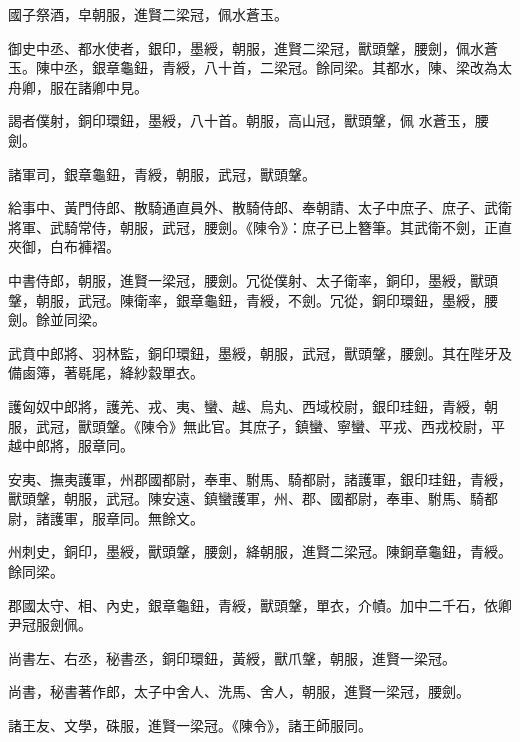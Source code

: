 \begin{pinyinscope}
 國子祭酒，皁朝服，進賢二梁冠，佩水蒼玉。



 御史中丞、都水使者，銀印，墨綬，朝服，進賢二梁冠，獸頭鞶，腰劍，佩水蒼玉。陳中丞，銀章龜鈕，青綬，八十首，二梁冠。餘同梁。其都水，陳、梁改為太舟卿，服在諸卿中見。



 謁者僕射，銅印環鈕，墨綬，八十首。朝服，高山冠，獸頭鞶，佩
 水蒼玉，腰劍。



 諸軍司，銀章龜鈕，青綬，朝服，武冠，獸頭鞶。



 給事中、黃門侍郎、散騎通直員外、散騎侍郎、奉朝請、太子中庶子、庶子、武衛將軍、武騎常侍，朝服，武冠，腰劍。《陳令》：庶子已上簪筆。其武衛不劍，正直夾御，白布褲褶。



 中書侍郎，朝服，進賢一梁冠，腰劍。冗從僕射、太子衛率，銅印，墨綬，獸頭鞶，朝服，武冠。陳衛率，銀章龜鈕，青綬，不劍。冗從，銅印環鈕，墨綬，腰劍。餘並同梁。



 武賁中郎將、羽林監，銅印環鈕，墨綬，朝服，武冠，獸頭鞶，腰劍。其在陛牙及備鹵簿，著毼尾，絳紗縠單衣。



 護匈奴中郎將，護羌、戎、夷、蠻、越、烏丸、西域校尉，銀印珪鈕，青綬，朝服，武冠，獸頭鞶。《陳令》無此官。其庶子，鎮蠻、寧蠻、平戎、西戎校尉，平越中郎將，服章同。



 安夷、撫夷護軍，州郡國都尉，奉車、駙馬、騎都尉，諸護軍，銀印珪鈕，青綬，獸頭鞶，朝服，武冠。陳安遠、鎮蠻護軍，州、郡、國都尉，奉車、駙馬、騎都尉，諸護軍，服章同。無餘文。



 州刺史，銅印，墨綬，獸頭鞶，腰劍，絳朝服，進賢二梁冠。陳銅章龜鈕，青綬。餘同梁。



 郡國太守、相、內史，銀章龜鈕，青綬，獸頭鞶，單衣，介幘。加中二千石，依卿尹冠服劍佩。



 尚書左、右丞，秘書丞，銅印環鈕，黃綬，獸爪鞶，朝服，進賢一梁冠。



 尚書，秘書著作郎，太子中舍人、洗馬、舍人，朝服，進賢一梁冠，腰劍。



 諸王友、文學，硃服，進賢一梁冠。《陳令》，諸王師服同。




\end{pinyinscope}

